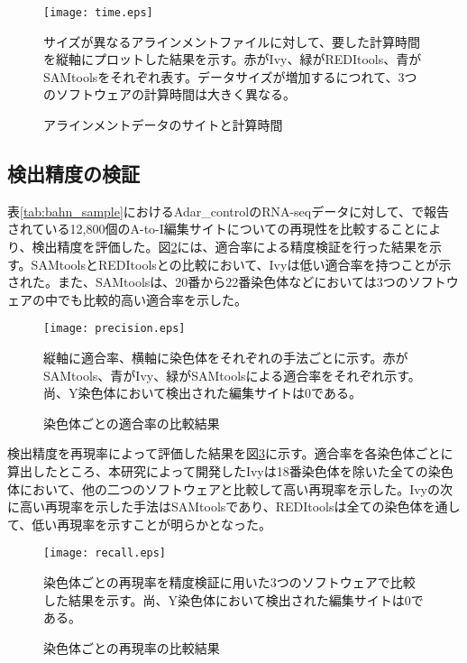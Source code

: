 \begin{figure}[!ht]
	\begin{center}
		\texttt{[image: time.eps]}
	\end{center}
	\caption{アラインメントデータのサイトと計算時間}
	\begin{flushleft}
		\small{サイズが異なるアラインメントファイルに対して、要した計算時間を縦軸にプロットした結果を示す。赤がIvy、緑がREDItools、青がSAMtoolsをそれぞれ表す。データサイズが増加するにつれて、3つのソフトウェアの計算時間は大きく異なる。}
	\end{flushleft}
	\label{fig:mesured_time}
\end{figure}

\subsection{検出精度の検証}
表\ref{tab:bahn_sample}におけるAdar\_controlのRNA-seqデータに対して、\cite{BahLeeLi1201}で報告されている12,800個のA-to-I編集サイトについての再現性を比較することにより、検出精度を評価した。図\ref{fig:precision}には、適合率による精度検証を行った結果を示す。SAMtoolsとREDItoolsとの比較において、Ivyは低い適合率を持つことが示された。また、SAMtoolsは、20番から22番染色体などにおいては3つのソフトウェアの中でも比較的高い適合率を示した。
\begin{figure}[!ht]
	\begin{center}
		\texttt{[image: precision.eps]}
	\end{center}
	\caption{染色体ごとの適合率の比較結果}
	\begin{flushleft}
		\small{縦軸に適合率、横軸に染色体をそれぞれの手法ごとに示す。赤がSAMtools、青がIvy、緑がSAMtoolsによる適合率をそれぞれ示す。尚、Y染色体において検出された編集サイトは0である。}
	\end{flushleft}
	\label{fig:precision}
\end{figure}

検出精度を再現率によって評価した結果を図\ref{fig:recall}に示す。適合率を各染色体ごとに算出したところ、本研究によって開発したIvyは18番染色体を除いた全ての染色体において、他の二つのソフトウェアと比較して高い再現率を示した。Ivyの次に高い再現率を示した手法はSAMtoolsであり、REDItoolsは全ての染色体を通して、低い再現率を示すことが明らかとなった。

\begin{figure}[!ht]
	\begin{center}
		\texttt{[image: recall.eps]}
	\end{center}
	\caption{染色体ごとの再現率の比較結果}
	\begin{flushleft}
		\small{染色体ごとの再現率を精度検証に用いた3つのソフトウェアで比較した結果を示す。尚、Y染色体において検出された編集サイトは0である。}
	\end{flushleft}
	\label{fig:recall}
\end{figure}

